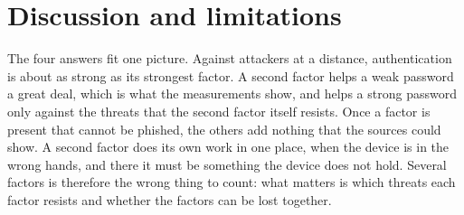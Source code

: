 \section{Discussion and limitations}\label{sec:discussion}

The four answers fit one picture.
Against attackers at a distance, authentication is about as strong as
its strongest factor.
A second factor helps a weak password a great deal, which is what the
measurements show, and helps a strong password only against the threats
that the second factor itself resists.
Once a factor is present that cannot be phished, the others add nothing
that the sources could show.
A second factor does its own work in one place, when the device is in
the wrong hands, and there it must be something the device does not
hold.
Several factors is therefore the wrong thing to count: what matters is
which threats each factor resists and whether the factors can be lost
together.

